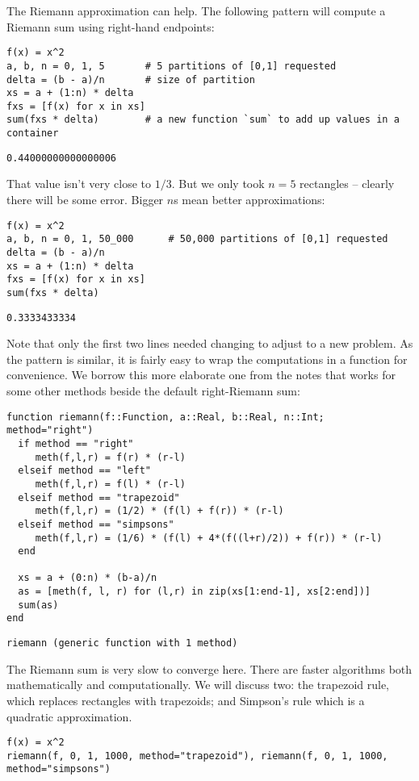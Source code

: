 \documentclass[12pt]{article}
\begin{document}
The Riemann approximation can help. The following pattern will compute a Riemann sum using right-hand endpoints:\begin{verbatim}
f(x) = x^2
a, b, n = 0, 1, 5		# 5 partitions of [0,1] requested
delta = (b - a)/n		# size of partition
xs = a + (1:n) * delta	
fxs = [f(x) for x in xs]
sum(fxs * delta)		# a new function `sum` to add up values in a container
\end{verbatim}
\begin{verbatim}
0.44000000000000006\end{verbatim}
\newline
That value isn't very close to $1/3$. But we only took $n=5$ rectangles – clearly there will be some error. Bigger $n$s mean better approximations:\begin{verbatim}
f(x) = x^2
a, b, n = 0, 1, 50_000		# 50,000 partitions of [0,1] requested
delta = (b - a)/n		
xs = a + (1:n) * delta	
fxs = [f(x) for x in xs]
sum(fxs * delta)
\end{verbatim}
\begin{verbatim}
0.3333433334\end{verbatim}
\newline
Note that only the first two lines needed changing to adjust to a new problem. As the pattern is similar, it is fairly easy to wrap the computations in a function for convenience. We borrow this more elaborate one from the notes that works for some other methods beside the default right-Riemann sum:\begin{verbatim}
function riemann(f::Function, a::Real, b::Real, n::Int; method="right")
  if method == "right"
     meth(f,l,r) = f(r) * (r-l)
  elseif method == "left"
     meth(f,l,r) = f(l) * (r-l)
  elseif method == "trapezoid"
     meth(f,l,r) = (1/2) * (f(l) + f(r)) * (r-l)
  elseif method == "simpsons"
     meth(f,l,r) = (1/6) * (f(l) + 4*(f((l+r)/2)) + f(r)) * (r-l)
  end

  xs = a + (0:n) * (b-a)/n
  as = [meth(f, l, r) for (l,r) in zip(xs[1:end-1], xs[2:end])]
  sum(as)
end
\end{verbatim}
\begin{verbatim}
riemann (generic function with 1 method)\end{verbatim}
\newline
The Riemann sum is very slow to converge here. There are faster algorithms both mathematically and computationally. We will discuss two: the trapezoid rule, which replaces rectangles with trapezoids; and Simpson's rule which is a quadratic approximation.\begin{verbatim}
f(x) = x^2
riemann(f, 0, 1, 1000, method="trapezoid"), riemann(f, 0, 1, 1000, method="simpsons")
\end{verbatim}
\end{document}

